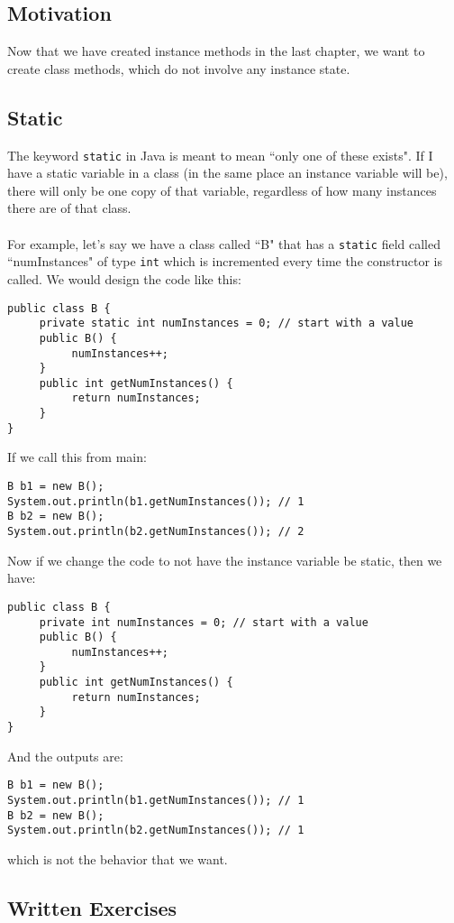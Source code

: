 
\subsection{Motivation}
Now that we have created instance methods in the last chapter, we want to create class methods, which do not involve any instance state.

\subsection{Static}
The keyword \verb|static| in Java is meant to mean ``only one of these exists". If I have a static variable in a class (in the same place an instance variable will be), there will only be one copy of that variable, regardless of how many instances there are of that class.
\\ \\
For example, let's say we have a class called ``B" that has a \verb|static| field called ``numInstances" of type \verb|int| which is incremented every time the constructor is called. We would design the code like this:
\begin{lstlisting}
public class B {
     private static int numInstances = 0; // start with a value
     public B() {
          numInstances++;
     }
     public int getNumInstances() {
          return numInstances;
     }
}
\end{lstlisting}
If we call this from main:
\begin{lstlisting}
B b1 = new B();
System.out.println(b1.getNumInstances()); // 1
B b2 = new B();
System.out.println(b2.getNumInstances()); // 2
\end{lstlisting}
Now if we change the code to not have the instance variable be static, then we have:
\begin{lstlisting}
public class B {
     private int numInstances = 0; // start with a value
     public B() {
          numInstances++;
     }
     public int getNumInstances() {
          return numInstances;
     }
}
\end{lstlisting}
And the outputs are:
\begin{lstlisting}
B b1 = new B();
System.out.println(b1.getNumInstances()); // 1
B b2 = new B();
System.out.println(b2.getNumInstances()); // 1
\end{lstlisting}
which is not the behavior that we want.

\subsection{Written Exercises}

